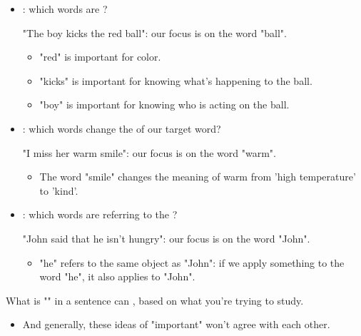     \begin{itemize}
        \item {}: which words are ?

        \miniex "The boy kicks the red ball": our focus is on the word "ball". 

            \begin{itemize}
                \item "red" is important for color.

                \item "kicks" is important for knowing what's happening to the ball.

                \item "boy" is important for knowing who is acting on the ball.\\
            \end{itemize}

        \item {}: which words change the  of our target word?

        \miniex "I miss her warm smile": our focus is on the word "warm".

            \begin{itemize}
                \item The word "smile" changes the meaning of warm from 'high temperature' to 'kind'.\\
            \end{itemize}

        \item {}: which words are referring to the ?

        \miniex "John said that he isn't hungry": our focus is on the word "John".

            \begin{itemize}
                \item "he" refers to the same object as "John": if we apply something to the word "he", it also applies to "John".\\
            \end{itemize}

    \end{itemize}

    \begin{concept}
        What is "" in a sentence can , based on what you're trying to study.

        \begin{itemize}
            \item And generally, these ideas of "important" won't agree with each other.
        \end{itemize}
    \end{concept}

